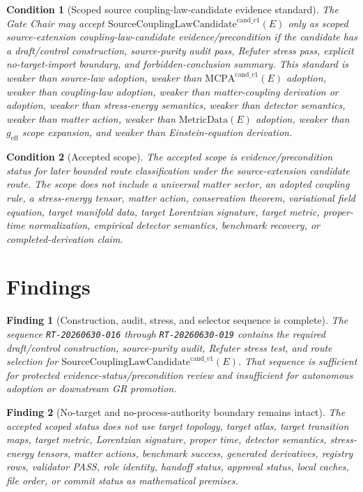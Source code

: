 \documentclass[11pt]{article}
\newcommand{\SCLC}{\mathrm{SourceCouplingLawCandidate}^{\mathrm{cand}\_v1}}
\newcommand{\MCPA}{\mathrm{MCPA}^{\mathrm{cand}\_v1}}
\newcommand{\MetricData}{\mathrm{MetricData}}
\newcommand{\geff}{g_{\mathrm{eff}}}
\newtheorem{finding}{Finding}
\newtheorem{condition}{Condition}
\begin{document}
\begin{condition}[Scoped source coupling-law-candidate evidence standard]
The Gate Chair may accept \(\SCLC(E)\) only as scoped source-extension
coupling-law-candidate evidence/precondition if the candidate has a
draft/control construction, source-purity audit pass, Refuter stress pass,
explicit no-target-import boundary, and forbidden-conclusion summary. This
standard is weaker than source-law adoption, weaker than \(\MCPA(E)\)
adoption, weaker than coupling-law adoption, weaker than matter-coupling
derivation or adoption, weaker than stress-energy semantics, weaker than
detector semantics, weaker than matter action, weaker than \(\MetricData(E)\)
adoption, weaker than \(\geff\) scope expansion, and weaker than
Einstein-equation derivation.
\end{condition}

\begin{condition}[Accepted scope]
The accepted scope is evidence/precondition status for later bounded route
classification under the source-extension candidate route. The scope does not
include a universal matter sector, an adopted coupling rule, a stress-energy
tensor, matter action, conservation theorem, variational field equation,
target manifold data, target Lorentzian signature, target metric, proper-time
normalization, empirical detector semantics, benchmark recovery, or
completed-derivation claim.
\end{condition}

\section{Findings}

\begin{finding}[Construction, audit, stress, and selector sequence is complete]
The sequence \texttt{RT-20260630-016} through \texttt{RT-20260630-019}
contains the required draft/control construction, source-purity audit,
Refuter stress test, and route selection for \(\SCLC(E)\). That sequence is
sufficient for protected evidence-status/precondition review and insufficient
for autonomous adoption or downstream GR promotion.
\end{finding}

\begin{finding}[No-target and no-process-authority boundary remains intact]
The accepted scoped status does not use target topology, target atlas, target
transition maps, target metric, Lorentzian signature, proper time, detector
semantics, stress-energy tensors, matter actions, benchmark success,
generated derivatives, registry rows, validator PASS, role identity, handoff
status, approval status, local caches, file order, or commit status as
mathematical premises.
\end{finding}
\end{document}
